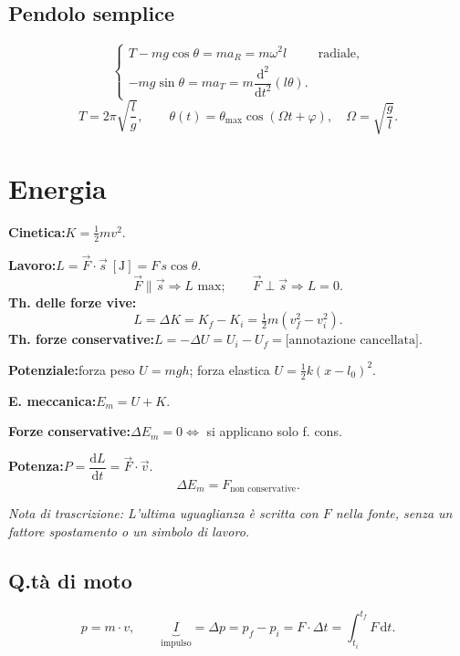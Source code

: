 \documentclass[a4paper,11pt]{article}
\newcommand{\orig}[1]{\clearpage}
\newcommand{\nota}[1]{\par\small\textit{Nota di trascrizione: #1}\par\normalsize}
\newcommand{\vv}[1]{\vec{#1}}
\newcommand{\dd}{\mathrm{d}}
\begin{document}
\subsection*{Pendolo semplice}
\begin{center}\end{center}
\[\begin{cases}T-mg\cos\theta=ma_R=m\omega^2l &\text{radiale},\\-mg\sin\theta=ma_T=m\dfrac{\dd^2}{\dd t^2}(l\theta).\end{cases}\]
\[T=2\pi\sqrt{\frac lg},\qquad \theta(t)=\theta_{\max}\cos(\Omega t+\varphi),\quad \Omega=\sqrt{\frac gl}.\]
\orig{4}\section*{Energia}
\textbf{Cinetica:}\quad $K=\tfrac12mv^2$.

\textbf{Lavoro:}\quad $L=\vv F\cdot\vv s\ [\mathrm J]=F\,s\cos\theta$.
\[\vv F\parallel\vv s\Rightarrow L\text{ max};\qquad \vv F\perp\vv s\Rightarrow L=0.\]
\textbf{Th. delle forze vive:}
\[L=\Delta K=K_f-K_i=\tfrac12m(v_f^2-v_i^2).\]
\textbf{Th. forze conservative:}\quad $L=-\Delta U=U_i-U_f=\text{[annotazione cancellata]}$.

\textbf{Potenziale:}\quad forza peso $U=mgh$; forza elastica $U=\tfrac12k(x-l_0)^2$.

\textbf{E. meccanica:}\quad $E_m=U+K$.

\textbf{Forze conservative:}\quad $\Delta E_m=0\Longleftrightarrow$ si applicano solo f. cons.

\textbf{Potenza:}\quad $P=\dfrac{\dd L}{\dd t}=\vv F\cdot\vv v$.
\[\Delta E_m=F_{\text{non conservative}}.\]
\nota{L'ultima uguaglianza è scritta con $F$ nella fonte, senza un fattore spostamento o un simbolo di lavoro.}
\subsection*{Q.tà di moto}
\[p=m\cdot v,\qquad \underbrace I_{\text{impulso}}=\Delta p=p_f-p_i=F\cdot\Delta t=\int_{t_i}^{t_f}F\,\dd t.\]
\end{document}
